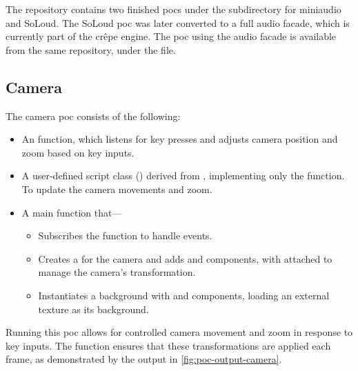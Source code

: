 \documentclass{projdoc}
\begin{document}
The repository \autocite{crepe:code-repo} contains two finished \glspl{poc} under the
 subdirectory for miniaudio and SoLoud. The SoLoud \gls{poc}
was later converted to a full audio \gls{facade}, which is currently part of the
cr\^epe engine. The \gls{poc} using the audio \gls{facade} is available from the same
repository, under the  file.

\subsection{Camera}
\label{poc:camera}

The camera \gls{poc} \autocite[camera example]{crepe:code-repo} consists of the
following:\noparbreak
\begin{itemize}
	\item An  function, which listens for key presses and
		adjusts camera position and zoom based on key inputs.
	\item A user-defined script class () derived from
		, implementing only the  function. To
		update the camera movements and zoom.
	\item A main function that---
		\begin{itemize}
			\item Subscribes the  function to handle
				 events.
			\item Creates a  for the camera and adds
				 and  components, with
				 attached to manage the camera's transformation.
			\item Instantiates a background  with
				 and  components, loading an
				external texture as its background.
		\end{itemize}
\end{itemize}

Running this \gls{poc} allows for controlled camera movement and zoom in response to
key inputs. The  function ensures that these
transformations are applied each frame, as demonstrated by the output in
\cref{fig:poc-output-camera}.
\end{document}
